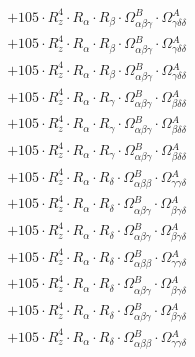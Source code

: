 \documentclass{article}
\begin{document}
\begin{subequations}
\begin{gather}
\begin{array}{c}
 \\[0.2em] 		 + 105 \cdot R_{z}^{4} \cdot R_{\alpha{}} \cdot R_{\beta{}} \cdot \Omega{}^{B}_{\alpha{}\beta{}\gamma{}} \cdot \Omega{}^{A}_{\gamma{}\delta{}\delta{}} 
 \\[0.2em] 		 + 105 \cdot R_{z}^{4} \cdot R_{\alpha{}} \cdot R_{\beta{}} \cdot \Omega{}^{B}_{\alpha{}\beta{}\gamma{}} \cdot \Omega{}^{A}_{\gamma{}\delta{}\delta{}} 
 \\[0.2em] 		 + 105 \cdot R_{z}^{4} \cdot R_{\alpha{}} \cdot R_{\beta{}} \cdot \Omega{}^{B}_{\alpha{}\beta{}\gamma{}} \cdot \Omega{}^{A}_{\gamma{}\delta{}\delta{}} 
 \\[0.2em] 		 + 105 \cdot R_{z}^{4} \cdot R_{\alpha{}} \cdot R_{\gamma{}} \cdot \Omega{}^{B}_{\alpha{}\beta{}\gamma{}} \cdot \Omega{}^{A}_{\beta{}\delta{}\delta{}} 
 \\[0.2em] 		 + 105 \cdot R_{z}^{4} \cdot R_{\alpha{}} \cdot R_{\gamma{}} \cdot \Omega{}^{B}_{\alpha{}\beta{}\gamma{}} \cdot \Omega{}^{A}_{\beta{}\delta{}\delta{}} 
 \\[0.2em] 		 + 105 \cdot R_{z}^{4} \cdot R_{\alpha{}} \cdot R_{\gamma{}} \cdot \Omega{}^{B}_{\alpha{}\beta{}\gamma{}} \cdot \Omega{}^{A}_{\beta{}\delta{}\delta{}} 
 \\[0.2em] 		 + 105 \cdot R_{z}^{4} \cdot R_{\alpha{}} \cdot R_{\delta{}} \cdot \Omega{}^{B}_{\alpha{}\beta{}\beta{}} \cdot \Omega{}^{A}_{\gamma{}\gamma{}\delta{}} 
 \\[0.2em] 		 + 105 \cdot R_{z}^{4} \cdot R_{\alpha{}} \cdot R_{\delta{}} \cdot \Omega{}^{B}_{\alpha{}\beta{}\gamma{}} \cdot \Omega{}^{A}_{\beta{}\gamma{}\delta{}} 
 \\[0.2em] 		 + 105 \cdot R_{z}^{4} \cdot R_{\alpha{}} \cdot R_{\delta{}} \cdot \Omega{}^{B}_{\alpha{}\beta{}\gamma{}} \cdot \Omega{}^{A}_{\beta{}\gamma{}\delta{}} 
 \\[0.2em] 		 + 105 \cdot R_{z}^{4} \cdot R_{\alpha{}} \cdot R_{\delta{}} \cdot \Omega{}^{B}_{\alpha{}\beta{}\beta{}} \cdot \Omega{}^{A}_{\gamma{}\gamma{}\delta{}} 
 \\[0.2em] 		 + 105 \cdot R_{z}^{4} \cdot R_{\alpha{}} \cdot R_{\delta{}} \cdot \Omega{}^{B}_{\alpha{}\beta{}\gamma{}} \cdot \Omega{}^{A}_{\beta{}\gamma{}\delta{}} 
 \\[0.2em] 		 + 105 \cdot R_{z}^{4} \cdot R_{\alpha{}} \cdot R_{\delta{}} \cdot \Omega{}^{B}_{\alpha{}\beta{}\gamma{}} \cdot \Omega{}^{A}_{\beta{}\gamma{}\delta{}} 
 \\[0.2em] 		 + 105 \cdot R_{z}^{4} \cdot R_{\alpha{}} \cdot R_{\delta{}} \cdot \Omega{}^{B}_{\alpha{}\beta{}\beta{}} \cdot \Omega{}^{A}_{\gamma{}\gamma{}\delta{}} 

\end{array}
\end{gather}
\end{subequations}
\end{document}
